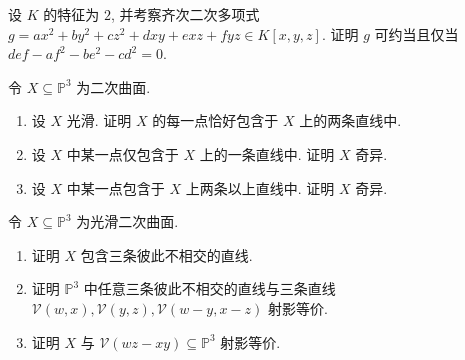 \begin{BookExercises}
  \item\label{ex:reducibility-criterion-for-conics-in-characteristic-two} 设 $K$ 的特征为 $2$, 并考察齐次二次多项式 $g=ax^{2}+by^{2}+cz^{2}+dxy+exz+fyz\in K[x,y,z]$. 证明 $g$ 可约当且仅当 $def-af^{2}-be^{2}-cd^{2}=0$.
  \item\label{ex:smooth-quadric-iff-doubly-ruled} 令 $X\subseteq\mathbb{P}^{3}$ 为二次曲面.
  \begin{enumerate}
    \item 设 $X$ 光滑. 证明 $X$ 的每一点恰好包含于 $X$ 上的两条直线中.
    \item 设 $X$ 中某一点仅包含于 $X$ 上的一条直线中. 证明 $X$ 奇异.
    \item 设 $X$ 中某一点包含于 $X$ 上两条以上直线中. 证明 $X$ 奇异.
  \end{enumerate}
  \item\label{ex:smooth-quadric-projectively-equivalent-to-segre-surface} 令 $X\subseteq\mathbb{P}^{3}$ 为光滑二次曲面.
  \begin{enumerate}
    \item 证明 $X$ 包含三条彼此不相交的直线.
    \item 证明 $\mathbb{P}^{3}$ 中任意三条彼此不相交的直线与三条直线 $\mathcal{V}(w,x),\mathcal{V}(y,z),\mathcal{V}(w-y,x-z)$ 射影等价.
    \item 证明 $X$ 与 $\mathcal{V}(wz-xy)\subseteq\mathbb{P}^{3}$ 射影等价.
  \end{enumerate}
\end{BookExercises}
